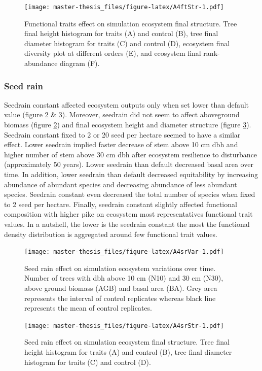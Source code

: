 \documentclass[12pt,]{article}
\theoremstyle{definition}
\theoremstyle{definition}
\theoremstyle{remark}
\begin{document}
\begin{figure}[htbp]
\centering
\texttt{[image: master-thesis\_files/figure-latex/A4ftStr-1.pdf]}
\caption{\label{fig:A4ftStr}Functional traits effect on simulation ecosystem
final structure. Tree final height histogram for traits (A) and control
(B), tree final diameter histogram for traits (C) and control (D),
ecosystem final diversity plot at different orders (E), and ecosystem
final rank-abundance diagram (F).}
\end{figure}

\subsubsection{Seed rain}\label{seed-rain}

Seedrain constant affected ecosystem outputs only when set lower than
default value (figure \ref{fig:A4srVar} \& \ref{fig:A4srStr}). Moreover,
seedrain did not seem to affect aboveground biomass (figure
\ref{fig:A4srVar}) and final ecosystem height and diameter structure
(figure \ref{fig:A4srStr}). Seedrain constant fixed to 2 or 20 seed per
hectare seemed to have a similar effect. Lower seedrain implied faster
decrease of stem above 10 cm dbh and higher number of stem above 30 cm
dbh after ecosystem resilience to disturbance (approximately 50 years).
Lower seedrain than default decreased basal area over time. In addition,
lower seedrain than default decreased equitability by increasing
abundance of abundant species and decreasing abundance of less abundant
species. Seedrain constant even decreased the total number of species
when fixed to 2 seed per hectare. Finally, seedrain constant slightly
affected functional composition with higher pike on ecosystem most
representatives functional trait values. In a nutshell, the lower is the
seedrain constant the most the functional density distribution is
aggregated around few functional trait values.

\begin{figure}[htbp]
\centering
\texttt{[image: master-thesis\_files/figure-latex/A4srVar-1.pdf]}
\caption{\label{fig:A4srVar}Seed rain effect on simulation ecosystem
variations over time. Number of trees with dbh above 10 cm (N10) and 30
cm (N30), above ground biomass (AGB) and basal area (BA). Grey area
represents the interval of control replicates whereas black line
represents the mean of control replicates.}
\end{figure}

\begin{figure}[htbp]
\centering
\texttt{[image: master-thesis\_files/figure-latex/A4srStr-1.pdf]}
\caption{\label{fig:A4srStr}Seed rain effect on simulation ecosystem final
structure. Tree final height histogram for traits (A) and control (B),
tree final diameter histogram for traits (C) and control (D).}
\end{figure}
\end{document}
